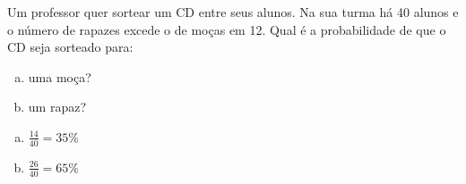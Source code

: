 \begin{ex}
Um professor quer sortear um CD entre seus alunos. Na sua turma há 40 alunos e o número de rapazes excede o de moças em 12.  Qual é a probabilidade de que o CD seja sorteado para:
   \begin{enumerate}[(a)]
   \item uma moça?
   \item um rapaz?
   \end{enumerate}
     \begin{sol}
      \phantom{A}
       \begin{enumerate} [(a)]
       \item $\frac{14}{40}=35\%$
       \item $\frac{26}{40}=65\%$
       \end{enumerate}
     \end{sol}
\end{ex}